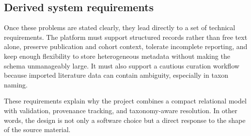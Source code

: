 \subsection{Derived system requirements}

Once these problems are stated clearly, they lead directly to a set of technical requirements. The platform must support structured records rather than free text alone, preserve publication and cohort context, tolerate incomplete reporting, and keep enough flexibility to store heterogeneous metadata without making the schema unmanageably large. It must also support a cautious curation workflow because imported literature data can contain ambiguity, especially in taxon naming.

These requirements explain why the project combines a compact relational model with validation, provenance tracking, and taxonomy-aware resolution. In other words, the design is not only a software choice but a direct response to the shape of the source material.
